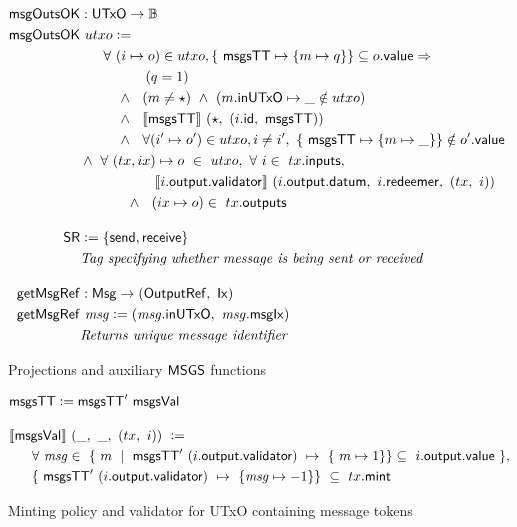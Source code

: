 \begin{figure}
  \begin{align*}
    \fun{msgOutsOK}& : \UTxO \to \B \\
    \fun{msgOutsOK}&~utxo \leteq~\\
    &~~~~~\forall~(i\mapsto o) \in utxo,
    \{~\msgsTT \mapsto \{ m \mapsto q \}\} \subseteq o.\val \Rightarrow\\
    &~~~~~~~~~~~~~~(q = 1) ~~\\
    &~~~~~~~~\wedge~~(m \neq \emptytype)~\wedge~(m.\fun{inUTxO} \mapsto \_ \notin utxo) ~~ \\
    &~~~~~~~~\wedge~~\applyMPScript{\msgsTT}~(\emptytype,~(i.\txrefid,~\msgsTT)) \\
    &~~~~~~~~\wedge~~\forall (i'\mapsto o') \in utxo, i\neq i',~\{~\msgsTT \mapsto \{ m \mapsto \_ \}\} \notin o'.\val \\
    &\wedge~\forall ~(tx, ix) \mapsto o~\in~utxo,~\forall ~i\in~tx.\inputs, \\
    &~~~~~~~~~~~~~~~~\applyScript{i.\fun{output}.\fun{validator}}~(i.\fun{output}.\datum,~i.\redeemer,~(tx,~i))~~ \\
    &~~~~~~~~~~\wedge~~(ix \mapsto o)\in~tx.\outputs
    \nextdef
    \SR &\leteq \{\send, \receive\} \\
    & \text{\emph{Tag specifying whether message is being sent or received}}
    \nextdef
    \fun{getMsgRef}& : \Msg \to (\OutputRef,~\Ix) \\
    \fun{getMsgRef}& ~\var{msg} \leteq (\var{msg}.\fun{inUTxO},~\var{msg}.\fun{msgIx}) \\
    & \text{\emph{Returns unique message identifier}}
  \end{align*}
\caption{Projections and auxiliary $\mathsf{MSGS}$ functions}
\label{fig:msgs-aux}
\end{figure}
%
\begin{figure}
  \begin{align*}
    & \msgsTT \leteq \msgsTT'~\msgsVal
    \nextdef
    &\applyScript{\msgsVal}~(\_,~\_,~(tx,~i))~\leteq \\
    &~~~~~\forall~\var{msg} \in~\{~m~\mid~\msgsTT'~(i.\fun{output}.\validator)~ \mapsto ~\{~m \mapsto 1 \} \} \subseteq ~i.\fun{output}.\val~\}, \\
    &~~~~~ \{~\msgsTT'~(i.\fun{output}.\validator)~ \mapsto ~\{ \var{msg} \mapsto -1 \} \} ~\subseteq~tx.\mint
  \end{align*}
\caption{Minting policy and validator for UTxO containing message tokens}
\label{fig:msgs-codeV}
\end{figure}
